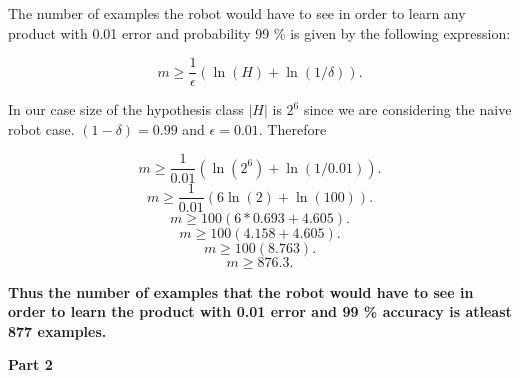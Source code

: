 \documentclass[12pt, fullpage,letterpaper]{article}
\begin{document}
\begin{itemize}
	The number of examples the robot would have to see in order to learn any product with 0.01 error and probability 99 \% is given by the following expression:
	
	\[
	m \geq  \frac{1}{ \epsilon}(\ln(H) + \ln(1/\delta)).
	\]
	
	In our case size of the hypothesis class $|H|$ is $2^6$ since we are considering the naive robot case. $(1-\delta)= 0.99$ and $\epsilon =0.01$. Therefore
	
		\[
		m \geq  \frac{1}{ 0.01}(\ln(2^6) + \ln(1/0.01)).
		\]
		\[
		m \geq  \frac{1}{ 0.01}(6 \ln(2) + \ln(100)).
		\]
		\[
			m \geq  100 (6 * 0.693 + 4.605).
		\]
		\[
			m \geq  100 (4.158+ 4.605).
		\]
		\[
			m \geq  100 (8.763).
		\]
		\[
			m \geq  876.3.
		\]
	
	\textbf{Thus the number of examples that the robot would have to see in order to learn the product with 0.01 error and 99 \% accuracy is atleast 877 examples.}		

\end{itemize}

\textbf{Part 2 }
\end{document}
